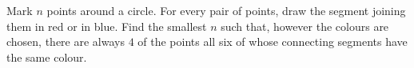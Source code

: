 Mark $n$ points around a circle. For every pair of points, draw the segment joining them in red or in blue. Find the smallest $n$ such that, however the colours are chosen, there are always $4$ of the points all six of whose connecting segments have the same colour.
